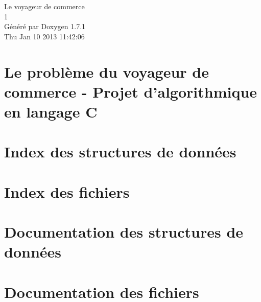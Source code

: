 \documentclass[a4paper]{book}
\begin{document}
\hypersetup{pageanchor=false}
\begin{titlepage}
\vspace*{7cm}
\begin{center}
{\Large Le voyageur de commerce \\[1ex]\large 1 }\\
\vspace*{1cm}
{\large Généré par Doxygen 1.7.1}\\
\vspace*{0.5cm}
{\small Thu Jan 10 2013 11:42:06}\\
\end{center}
\end{titlepage}
\clearemptydoublepage
{}
\tableofcontents
\clearemptydoublepage
{}
\hypersetup{pageanchor=true}
\chapter{Le problème du voyageur de commerce -\/ Projet d'algorithmique en langage C}
\label{index}\hypertarget{index}{}
\chapter{Index des structures de données}

\chapter{Index des fichiers}

\chapter{Documentation des structures de données}






\chapter{Documentation des fichiers}



















\printindex
\end{document}
